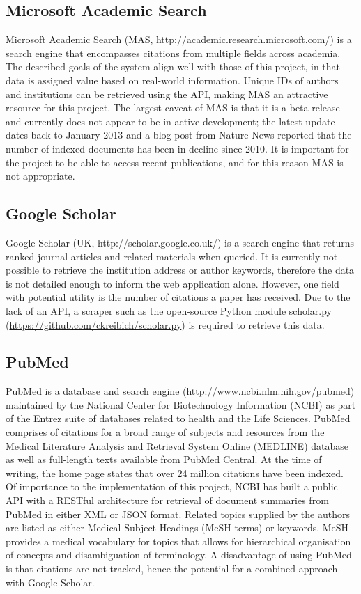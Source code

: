 \documentclass[PROP_AGutteridge_CS.tex]{subfiles}
\begin{document}
\noindent \subsection{Microsoft Academic Search}
Microsoft Academic Search (MAS, http://academic.research.microsoft.com/) is a search engine that encompasses citations from multiple fields across academia. The described goals of the system align well with those of this project, in that data is assigned value based on real-world information\cite{microsoft-help}. Unique IDs of authors and institutions can be retrieved using the API, making MAS an attractive resource for this project. The largest caveat of MAS is that it is a beta release and currently does not appear to be in active development; the latest update dates back to January 2013\cite{microsoft-help} and a blog post from Nature News reported that the number of indexed documents has been in decline since 2010\cite{nature-news}. It is important for the project to be able to access recent publications, and for this reason MAS is not appropriate.

\noindent \subsection{Google Scholar}
Google Scholar (UK, http://scholar.google.co.uk/) is a search engine that returns ranked journal articles and related materials when queried. It is currently not possible to retrieve the institution address or author keywords, therefore the data is not detailed enough to inform the web application alone. However, one field with potential utility is the number of citations a paper has received. Due to the lack of an API, a scraper such as the open-source Python module scholar.py (\url{https://github.com/ckreibich/scholar.py}) is required to retrieve this data.

\noindent \subsection{PubMed}
PubMed is a database and search engine (http://www.ncbi.nlm.nih.gov/pubmed) maintained by the National Center for Biotechnology Information (NCBI) as part of the Entrez suite of databases related to health and the Life Sciences. PubMed comprises of citations for a broad range of subjects and resources from the Medical Literature Analysis and Retrieval System Online (MEDLINE) database as well as full-length texts available from PubMed Central. At the time of writing, the home page\cite{pubmed} states that over 24 million citations have been indexed. \\
\newline \noindent Of importance to the implementation of this project, NCBI has built a public API with a RESTful architecture for retrieval of document summaries from PubMed in either XML or JSON format. Related topics supplied by the authors are listed as either Medical Subject Headings (MeSH terms) or keywords. MeSH provides a medical vocabulary for topics that allows for hierarchical organisation of concepts and disambiguation of terminology\cite{mesh}. A disadvantage of using PubMed is that citations are not tracked, hence the potential for a combined approach with Google Scholar. 
\end{document}
